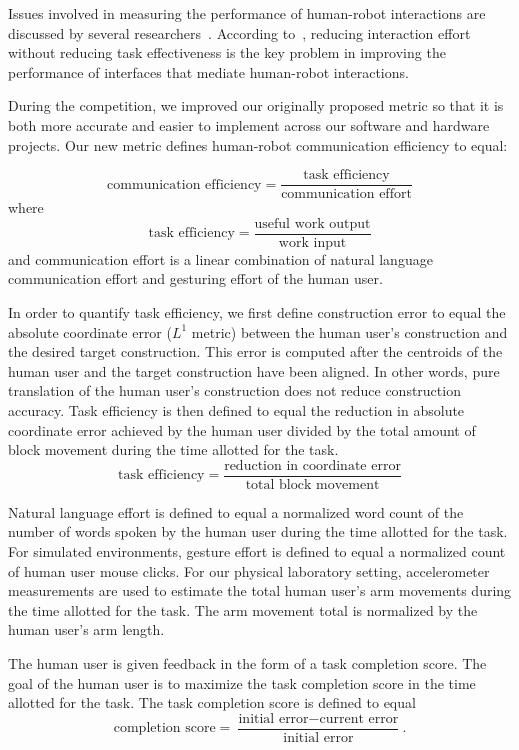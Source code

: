 \documentclass[letterpaper]{article} %
\begin{document}
Issues involved in measuring the performance of human-robot interactions are discussed by several researchers~\cite{Steinfeld2006,Crandall2007,Weiss2009,Singer2011}. According to~\cite{Olsen2003}, reducing interaction effort without reducing task effectiveness is the key problem in improving the performance of interfaces that mediate human-robot interactions. 

During the competition, we improved our originally proposed metric so that it is both more accurate and easier to implement across our software and hardware projects.  Our new metric defines human-robot communication efficiency to equal: 

\[
\text{communication efficiency} = \frac{\text{task efficiency}}{\text{communication effort}}
\]
where
\[
\text{task efficiency} = \frac{\text{useful work output}}{\text{work input}}
\]
and communication effort is a linear combination of natural language communication effort and gesturing effort of the human user. 

In order to quantify task efficiency, we first define construction error to equal the absolute coordinate error ($L^1$ metric) between the human user's construction and the desired target construction. This error is computed after the centroids of the
human user and the target construction have been aligned. In
other words, pure translation of the human user’s construction
does not reduce construction accuracy. Task efficiency is then defined to equal the reduction in absolute coordinate error achieved by the human user divided by the total amount of block movement during the time allotted for the task. 
\[
\text{task efficiency}=\frac{\text{reduction in coordinate error}}{\text{total block movement}}
\]

Natural language effort is defined to equal a normalized word count of the number of words spoken by the human user during the time allotted for the task. For simulated environments, gesture effort is defined to equal a normalized count of human user mouse clicks. For our physical laboratory setting, accelerometer measurements are used to estimate the total human user's arm movements during the time allotted for the task. The arm movement total is normalized by the human user's arm length. 

The human user is given feedback in the form of a task completion score. The goal of the human user is to maximize the task completion score in the time allotted for the task. The task completion score is defined to equal
\[
\text{completion score} =\frac{\text{initial error}-\text{current error}}{\text{initial error}}.
\]
\end{document}

